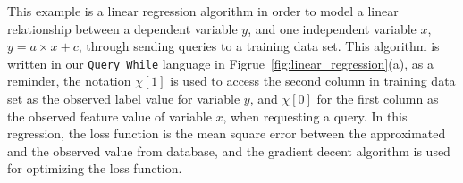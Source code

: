 %
\begin{example}
    This example is a linear regression algorithm 
    in order to
    model a linear relationship between a dependent variable $y$,
    and one independent variable $x$, $y = a \times x + c$,
    through sending queries to a training data set.
    This algorithm is written in our {\tt Query While} language in Figrue~\ref{fig:linear_regression}(a),
    as a reminder,
    the notation $\chi[1]$ is used to access the second column in training data set as the observed label value for variable $y$,
    and 
    $\chi[0]$ for the first column as the observed feature value of variable $x$, when requesting a query.
    In this regression, the loss function is the mean square error between the approximated and the observed value from database,
    and the gradient decent algorithm is used for optimizing the loss function.

\end{example}
